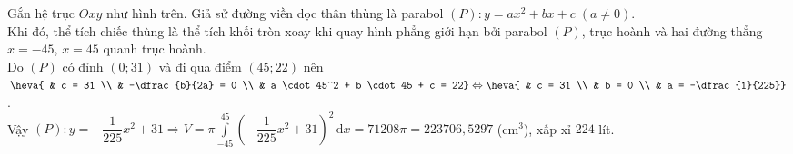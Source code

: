 \begin{ex}
{\begin{center}
\begin{tikzpicture}[scale = .1]
			\end{tikzpicture}
		\end{center}
		Gắn hệ trục $Oxy$ như hình trên. Giả sử đường viền dọc thân thùng là parabol $\left(P\right) \colon y = ax^2 + bx + c\; \left(a \ne 0\right)$. \\
		Khi đó, thể tích chiếc thùng là thể tích khối tròn xoay khi quay hình phẳng giới hạn bởi parabol $\left(P\right)$, trục hoành và hai đường thẳng $x = -45$, $x = 45$ quanh trục hoành. \\
		Do $\left(P\right)$ có đỉnh $\left(0; 31\right)$ và đi qua điểm $\left(45; 22\right)$ nên $\heva{
			& c = 31 \\
			& -\dfrac{b}{2a} = 0 \\
			& a \cdot 45^2 + b \cdot 45 + c = 22} \Leftrightarrow \heva{
			& c = 31 \\
			& b = 0 \\
			& a = -\dfrac{1}{225}}$. \\
		Vậy $\left(P\right) \colon y = -\dfrac{1}{225}x^2 + 31 \Rightarrow V = \pi\displaystyle\int\limits_{-45}^{45}{\left(-\dfrac{1}{225}x^2 + 31\right)^2}{\mathrm{\, d}}x = 71208\pi = 223706{,}5297$ (cm$^3$), xấp xỉ $224$ lít.
	}
\end{ex}

